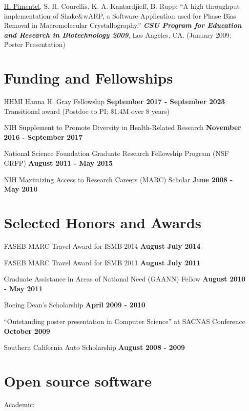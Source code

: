\documentclass[overlapped]{res}
\begin{document}
\begin{resume}
\underline{H. Pimentel}, S. H. Courellis, K. A. Kantardjieff, B. Rupp:
``A high throughput implementation of Shake\&wARP, a Software
Application used for Phase Bias Removal in Macromolecular
Crystallography.'' {\bf \emph{CSU Program for Education and Research
   in Biotechnology 2009}}, Los Angeles, CA. (January 2009; Poster Presentation)

\newpage

\section{\sc Funding and Fellowships}

HHMI Hanna H. Gray Fellowship \hfill {\bf September 2017 - September 2023}\\
Transitional award (Postdoc to PI; \$1.4M over 8 years)

NIH Supplement to Promote Diversity in Health-Related Research \hfill {\bf November 2016 - September 2017}

National Science Foundation Graduate Research Fellowship Program (NSF GRFP)
\hfill {\bf August 2011 - May 2015}

NIH Maximizing Access to Research Careers (MARC) Scholar \hfill {\bf
  June 2008 - May 2010}

\section{\sc Selected Honors and Awards}

FASEB MARC Travel Award for ISMB 2014 \hfill {\bf August
  July 2014}

FASEB MARC Travel Award for ISMB 2011 \hfill {\bf August
  July 2011}

Graduate Assistance in Areas of National Need (GAANN) Fellow \hfill {\bf August
  2010 - May 2011}

Boeing Dean's Scholarship \hfill {\bf April 2009 - 2010}

``Outstanding poster presentation in Computer Science'' at SACNAS
Conference \hfill {\bf October 2009}

Southern California Auto Scholarship \hfill {\bf August 2008 - 2009}

\section{\sc Open source software}

Academic:


\end{resume}
\end{document}
